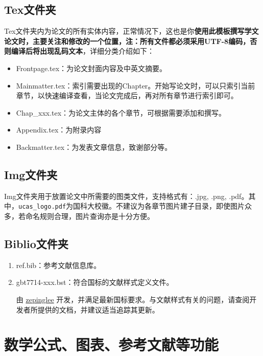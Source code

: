 \subsection{Tex文件夹}

Tex文件夹内为论文的所有实体内容，正常情况下，这也是你\textbf{使用此模板撰写学文论文时，主要关注和修改的一个位置，注：所有文件都必须采用UTF-8编码，否则编译后将出现乱码文本}，详细分类介绍如下：

\begin{itemize}
    \item Frontpage.tex：为论文封面内容及中英文摘要。
    \item Mainmatter.tex：索引需要出现的Chapter。开始写论文时，可以只索引当前章节，以快速编译查看，当论文完成后，再对所有章节进行索引即可。
    \item Chap{\_}xxx.tex：为论文主体的各个章节，可根据需要添加和撰写。
    \item Appendix.tex：为附录内容
    \item Backmatter.tex：为发表文章信息，致谢部分等。
\end{itemize}

\subsection{Img文件夹}

Img文件夹用于放置论文中所需要的图类文件，支持格式有：.jpg, .png, .pdf。其中，\verb|ucas_logo.pdf|为国科大校徽。不建议为各章节图片建子目录，即使图片众多，若命名规则合理，图片查询亦是十分方便。

\subsection{Biblio文件夹}

\begin{enumerate}
    \item ref.bib：参考文献信息库。
    \item gbt7714-xxx.bst：符合国标的文献样式定义文件。

        由 \href{https://github.com/zepinglee/gbt7714-bibtex-style}{zepinglee}  开发，并满足最新国标要求。与文献样式有关的问题，请查阅开发者所提供的文档，并建议适当追踪其更新。
\end{enumerate}

\section{数学公式、图表、参考文献等功能}

